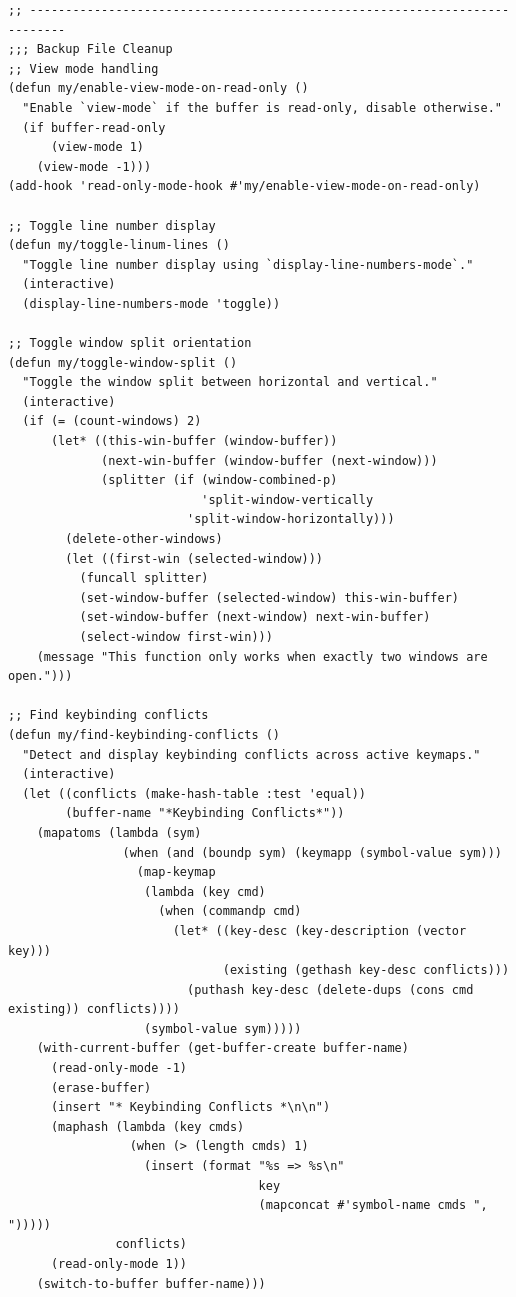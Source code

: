 \documentclass[11pt]{article}
\begin{document}
\begin{verbatim}
;; ---------------------------------------------------------------------------
;;; Backup File Cleanup
;; View mode handling
(defun my/enable-view-mode-on-read-only ()
  "Enable `view-mode` if the buffer is read-only, disable otherwise."
  (if buffer-read-only
      (view-mode 1)
    (view-mode -1)))
(add-hook 'read-only-mode-hook #'my/enable-view-mode-on-read-only)

;; Toggle line number display
(defun my/toggle-linum-lines ()
  "Toggle line number display using `display-line-numbers-mode`."
  (interactive)
  (display-line-numbers-mode 'toggle))

;; Toggle window split orientation
(defun my/toggle-window-split ()
  "Toggle the window split between horizontal and vertical."
  (interactive)
  (if (= (count-windows) 2)
      (let* ((this-win-buffer (window-buffer))
             (next-win-buffer (window-buffer (next-window)))
             (splitter (if (window-combined-p)
                           'split-window-vertically
                         'split-window-horizontally)))
        (delete-other-windows)
        (let ((first-win (selected-window)))
          (funcall splitter)
          (set-window-buffer (selected-window) this-win-buffer)
          (set-window-buffer (next-window) next-win-buffer)
          (select-window first-win)))
    (message "This function only works when exactly two windows are open.")))

;; Find keybinding conflicts
(defun my/find-keybinding-conflicts ()
  "Detect and display keybinding conflicts across active keymaps."
  (interactive)
  (let ((conflicts (make-hash-table :test 'equal))
        (buffer-name "*Keybinding Conflicts*"))
    (mapatoms (lambda (sym)
                (when (and (boundp sym) (keymapp (symbol-value sym)))
                  (map-keymap
                   (lambda (key cmd)
                     (when (commandp cmd)
                       (let* ((key-desc (key-description (vector key)))
                              (existing (gethash key-desc conflicts)))
                         (puthash key-desc (delete-dups (cons cmd existing)) conflicts))))
                   (symbol-value sym)))))
    (with-current-buffer (get-buffer-create buffer-name)
      (read-only-mode -1)
      (erase-buffer)
      (insert "* Keybinding Conflicts *\n\n")
      (maphash (lambda (key cmds)
                 (when (> (length cmds) 1)
                   (insert (format "%s => %s\n"
                                   key
                                   (mapconcat #'symbol-name cmds ", ")))))
               conflicts)
      (read-only-mode 1))
    (switch-to-buffer buffer-name)))


\end{verbatim}
\end{document}
